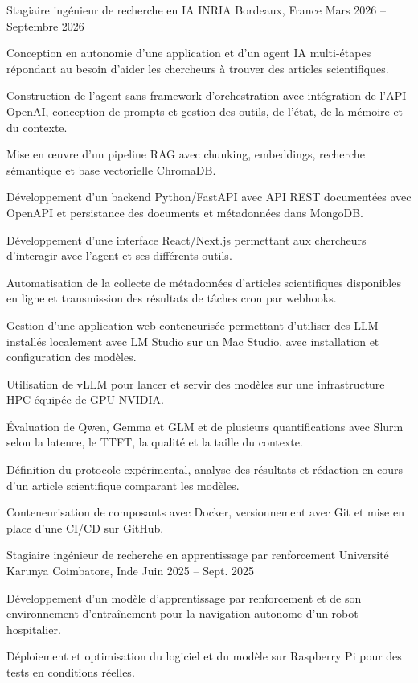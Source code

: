 
\begin{cventries}
  \cventry
    {Stagiaire ingénieur de recherche en IA}
    {INRIA}
    {Bordeaux, France}
    {Mars 2026 -- Septembre 2026}
    {
      \begin{cvitems}
        \item {Conception en autonomie d’une application et d’un agent IA multi-étapes répondant au besoin d’aider les chercheurs à trouver des articles scientifiques.}
        \item {Construction de l’agent sans framework d’orchestration avec intégration de l’API OpenAI, conception de prompts et gestion des outils, de l’état, de la mémoire et du contexte.}
        \item {Mise en œuvre d’un pipeline RAG avec chunking, embeddings, recherche sémantique et base vectorielle ChromaDB.}
        \item {Développement d’un backend Python/FastAPI avec API REST documentées avec OpenAPI et persistance des documents et métadonnées dans MongoDB.}
        \item {Développement d’une interface React/Next.js permettant aux chercheurs d’interagir avec l’agent et ses différents outils.}
        \item {Automatisation de la collecte de métadonnées d’articles scientifiques disponibles en ligne et transmission des résultats de tâches cron par webhooks.}
        \item {Gestion d’une application web conteneurisée permettant d’utiliser des LLM installés localement avec LM Studio sur un Mac Studio, avec installation et configuration des modèles.}
        \item {Utilisation de vLLM pour lancer et servir des modèles sur une infrastructure HPC équipée de GPU NVIDIA.}
        \item {Évaluation de Qwen, Gemma et GLM et de plusieurs quantifications avec Slurm selon la latence, le TTFT, la qualité et la taille du contexte.}
        \item {Définition du protocole expérimental, analyse des résultats et rédaction en cours d’un article scientifique comparant les modèles.}
        \item {Conteneurisation de composants avec Docker, versionnement avec Git et mise en place d’une CI/CD sur GitHub.}
      \end{cvitems}
    }

  \cventry
    {Stagiaire ingénieur de recherche en apprentissage par renforcement}
    {Université Karunya}
    {Coimbatore, Inde}
    {Juin 2025 -- Sept. 2025}
    {
      \begin{cvitems}
        \item {Développement d’un modèle d’apprentissage par renforcement et de son environnement d’entraînement pour la navigation autonome d’un robot hospitalier.}
        \item {Déploiement et optimisation du logiciel et du modèle sur Raspberry Pi pour des tests en conditions réelles.}
      \end{cvitems}
    }
\end{cventries}
